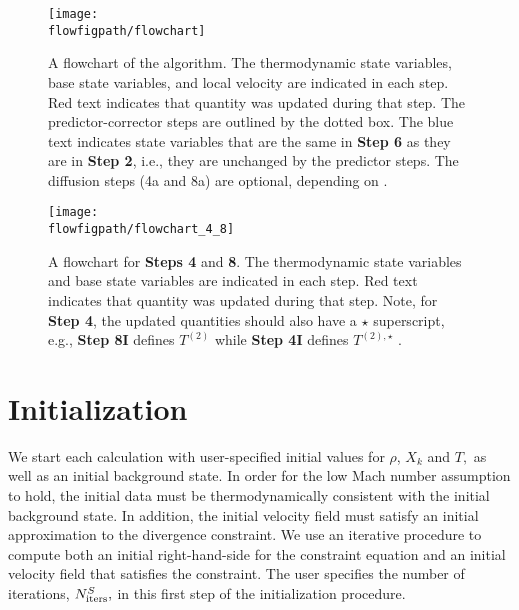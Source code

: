 \begin{figure}[tb]
\centering
\texttt{[image: \\flowfigpath/flowchart]}
\caption[Graphical flowchart of \maestro]
  {\label{Fig:flowchart} A flowchart of the algorithm.  The
  thermodynamic state variables, base state variables, and local velocity are
  indicated in each step.  Red text indicates that quantity was
  updated during that step.  The predictor-corrector steps are
  outlined by the dotted box.  The blue text indicates state
  variables that are the same in {\bf Step 6} as they are in
  {\bf Step 2}, i.e., they are unchanged by the predictor steps.
  The diffusion steps (4a and 8a) are optional, depending on
  .}
\end{figure}
\begin{figure}[tb]                                               
\centering
\texttt{[image: \\flowfigpath/flowchart\_4\_8]}
\caption[Graphical flowchart of the density and enthalpy update steps]
{\label{Fig:flowchart48} A flowchart for {\bf Steps 4} and {\bf 8}.
  The thermodynamic state variables and base state variables are
  indicated in each step.  Red text indicates that quantity was
  updated during that step.  Note, for {\bf Step 4}, the updated
  quantities should also have a $\star$ superscript, e.g., {\bf Step
    8I} defines $T^{(2)}$ while {\bf Step 4I} defines $T^{(2),\star}$
  .}
\end{figure}



\section{Initialization}\label{Sec:Initialization}

\label{sec:flow:initialization}
 
We start each calculation with user-specified initial values for
$\rho$, $X_k$ and $T,$ as well as an initial background state.  In
order for the low Mach number assumption to hold, the initial data
must be thermodynamically consistent with the initial background
state.  In addition, the initial velocity field must satisfy an
initial approximation to the divergence constraint.  We use an iterative
procedure to compute both an initial right-hand-side for the
constraint equation and an initial velocity field that satisfies
the constraint.  The user specifies the number of iterations,
$N_{\rm iters}^{S},$ in this first step of the initialization procedure.

